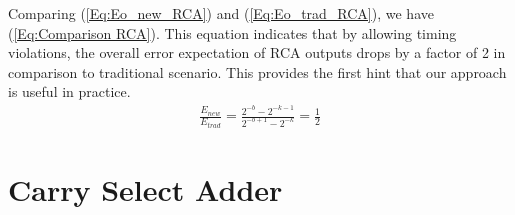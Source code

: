 \documentclass[prodmode,acmtrets]{acmsmall} %
\begin{document}
Comparing (\ref{Eq:Eo_new_RCA}) and (\ref{Eq:Eo_trad_RCA}), we have (\ref{Eq:Comparison RCA}). This equation indicates that by allowing timing violations, the overall error expectation of RCA outputs drops by a factor of 2 in comparison to traditional scenario. This provides the first hint that our approach is useful in practice.
%
\begin{eqnarray}\label{Eq:Comparison RCA}
  \frac{E_{new}}{E_{trad}}=\frac{2^{-b}-2^{-k-1}}{2^{-b+1}-2^{-k}}=\frac{1}{2}
\end{eqnarray}

\section{Carry Select Adder}\label{Section_CSA}
\end{document}
